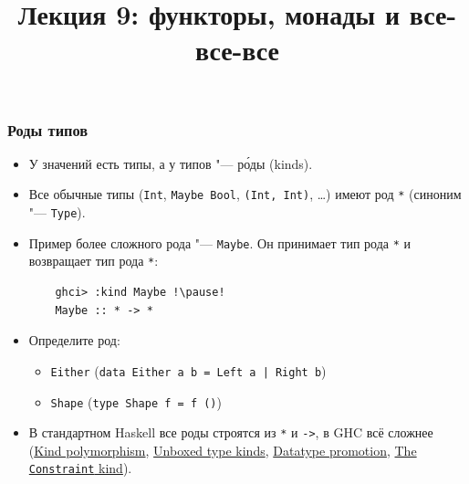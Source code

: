 \documentclass[11pt]{beamer}
\title{Лекция 9: функторы, монады и все-все-все}
\begin{document}
    \begin{frame}[plain]
    \maketitle
\end{frame}

\begin{frame}[fragile]
\frametitle{Роды типов}
\begin{itemize}
    \item У значений есть типы, а у типов "--- р\'{о}ды (kinds).
    \item Все обычные типы (\lstinline|Int|, \lstinline|Maybe Bool|, \lstinline|(Int, Int)|, \ldots) имеют род \lstinline|*| (синоним "--- \lstinline|Type|).
    \pause
    \item Пример более сложного рода "--- \lstinline|Maybe|. Он принимает тип рода \lstinline|*| и возвращает тип рода \lstinline|*|: 
    \begin{lstlisting}
    ghci> :kind Maybe !\pause!
    Maybe :: * -> *
    \end{lstlisting}
    \pause
    \item Определите род: 
    \begin{itemize}
        \item \lstinline!Either! (\lstinline!data Either a b = Left a | Right b!)
        \pause
        \item \lstinline!Shape! (\lstinline|type Shape f = f ()|)
        \pause
    \end{itemize}
    \item В стандартном Haskell все роды строятся из  \lstinline|*| и \lstinline|->|, в GHC всё сложнее (\href{https://downloads.haskell.org/~ghc/8.6.3/docs/html/users_guide/glasgow_exts.html#kind-polymorphism}{Kind polymorphism}, \href{https://downloads.haskell.org/~ghc/8.6.3/docs/html/users_guide/glasgow_exts.html#unboxed-types-and-primitive-operations}{Unboxed type kinds}, \href{https://downloads.haskell.org/~ghc/8.6.3/docs/html/users_guide/glasgow_exts.html#datatype-promotion}{Datatype promotion},  \href{https://downloads.haskell.org/~ghc/8.6.3/docs/html/users_guide/glasgow_exts.html#the-constraint-kind}{The \lstinline|Constraint| kind}).
\end{itemize}
\end{frame}
\end{document}
